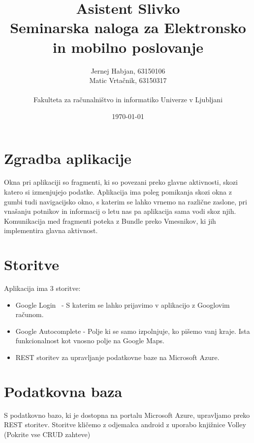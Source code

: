 \documentclass[11pt,a4paper]{article}
\title{Asistent Slivko \\
\large Seminarska naloga za Elektronsko in mobilno poslovanje}
\author{
Jernej Habjan, 63150106  \\
Matic Vrtačnik, 63150317 \\
\ \\
Fakulteta za računalništvo in informatiko Univerze v Ljubljani
\date{\today}         
}
\begin{document}
\maketitle


\section{Zgradba aplikacije}

Okna pri aplikaciji so fragmenti, ki so povezani preko glavne aktivnosti, skozi katero si izmenjujejo podatke.
Aplikacija ima poleg pomikanja skozi okna z gumbi tudi navigacijsko okno, s katerim se lahko vrnemo na različne zaslone, pri vnašanju potnikov in informacij o letu nas pa aplikacija sama vodi skoz njih.
Komunikacija med fragmenti poteka z Bundle preko Vmesnikov, ki jih implementira glavna aktivnost.


\section{Storitve}
Aplikacija ima 3 storitve:
\begin{itemize}
	\item Google Login~\cite{signIn} - S katerim se lahko prijavimo v aplikacijo z Googlovim računom.
	\item Google Autocomplete\cite{autocomplete} - Polje ki se samo izpolnjuje, ko pišemo vanj kraje. Ista funkcionalnost kot vnosno polje na Google Maps.
	\item REST storitev za upravljanje podatkovne baze na Microsoft Azure.
\end{itemize}


\section{Podatkovna baza}
S podatkovno bazo, ki je dostopna na portalu Microsoft Azure, upravljamo preko REST storitev.
Storitve kličemo z odjemalca android z uporabo knjižnice Volley (Pokrite vse CRUD zahteve)
\end{document}

